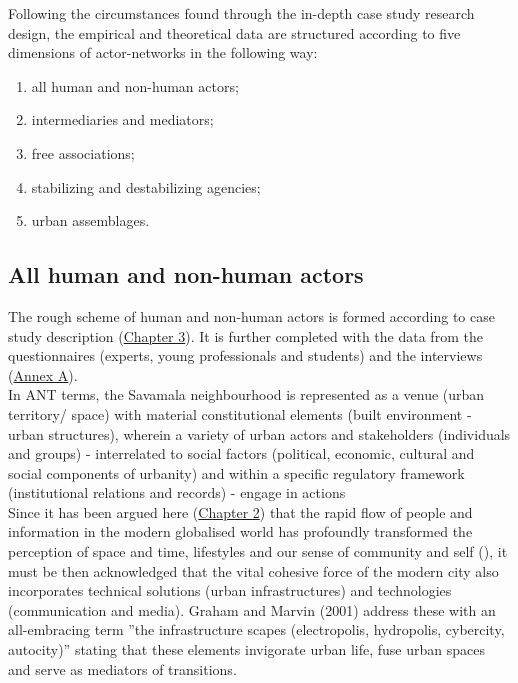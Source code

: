 \documentclass[11pt]{report}
\begin{document}
{{{{Following the circumstances found through the in-depth case study research design, the empirical and theoretical data are structured according to five dimensions of actor-networks in the following way:

\begin{enumerate}
\item all human and non-human actors;
\item intermediaries and mediators;
\item free associations;
\item stabilizing and destabilizing agencies;
\item urban assemblages.
\end{enumerate}

\subsection{All human and non-human actors}

The rough scheme of human and non-human actors is formed according to case study description
(\href{ref}{Chapter 3}). It is further completed with the data from the questionnaires (experts, young professionals and students) and the interviews
(\href{ref}{Annex A}).
\\

In ANT terms, the Savamala neighbourhood is represented as a venue (urban territory/ space) with material constitutional elements (built environment - urban structures), wherein a variety of urban actors and stakeholders (individuals and groups) - interrelated to social factors (political, economic, cultural and social components of urbanity) and within a specific regulatory framework (institutional relations and records) - engage in actions
\\

Since it has been argued here (\href{ref}{Chapter 2}) that the rapid flow of people and information in the modern globalised world has profoundly transformed the perception of space and time, lifestyles and our sense of community and self (\href{Ellin}{\citealt{ellin_postmodern_1999}}), it must be then acknowledged that the vital cohesive force of the modern city also incorporates technical solutions (urban infrastructures) and technologies (communication and media).
Graham and Marvin (2001) address these with an all-embracing term ”the infrastructure scapes (electropolis, hydropolis, cybercity, autocity)” stating that these elements invigorate urban life, fuse urban spaces and serve as mediators of transitions.
\\

}}}}
\end{document}
